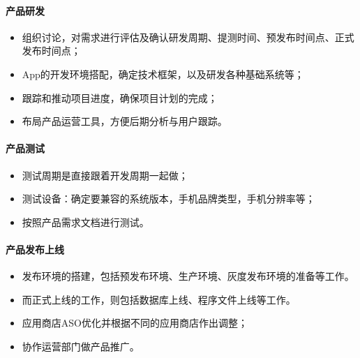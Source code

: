 \documentclass[letterpaper,10pt,english]{sphinxmanual}
\begin{document}
\paragraph{产品研发}
\label{\detokenize{chapter_project/process:id9}}\begin{itemize}
\item {} 
组织讨论，对需求进行评估及确认研发周期、提测时间、预发布时间点、正式发布时间点；

\item {} 
App的开发环境搭配，确定技术框架，以及研发各种基础系统等；

\item {} 
跟踪和推动项目进度，确保项目计划的完成；

\item {} 
布局产品运营工具，方便后期分析与用户跟踪。

\end{itemize}


\paragraph{产品测试}
\label{\detokenize{chapter_project/process:id10}}\begin{itemize}
\item {} 
测试周期是直接跟着开发周期一起做；

\item {} 
测试设备：确定要兼容的系统版本，手机品牌类型，手机分辨率等；

\item {} 
按照产品需求文档进行测试。

\end{itemize}


\paragraph{产品发布上线}
\label{\detokenize{chapter_project/process:id11}}\begin{itemize}
\item {} 
发布环境的搭建，包括预发布环境、生产环境、灰度发布环境的准备等工作。

\item {} 
而正式上线的工作，则包括数据库上线、程序文件上线等工作。

\item {} 
应用商店ASO优化并根据不同的应用商店作出调整；

\item {} 
协作运营部门做产品推广。

\end{itemize}
\end{document}
